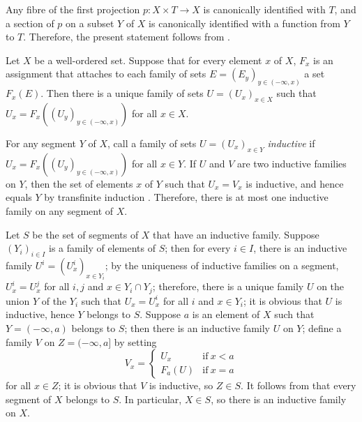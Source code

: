 \documentclass{article}
\begin{document}
Any fibre of the first projection \(p : X \times T \to X\) is
canonically identified with \(T\), and a section of \(p\) on a subset
\(Y\) of \(X\) is canonically identified with a function from \(Y\) to
\(T\).  Therefore, the present statement follows from
.

\begin{theorem}
  \label{thm:4axgzui8}
  Let \(X\) be a well-ordered set.  Suppose that for every element
  \(x\) of \(X\), \(F_x\) is an assignment that attaches to each
  family of sets \(E = (E_y)_{y \in (-\infty, x)}\) a set \(F_x(E)\).
  Then there is a unique family of sets \(U = (U_x)_{x \in X}\) such
  that \(U_x = F_x((U_y)_{y \in (-\infty, x)})\) for all \(x \in X\).
\end{theorem}

For any segment \(Y\) of \(X\), call a family of sets
\(U = (U_x)_{x \in Y}\) \emph{inductive} if
\(U_x = F_x((U_y)_{y \in (-\infty, x)})\) for all \(x \in Y\).  If
\(U\) and \(V\) are two inductive families on \(Y\), then the set of
elements \(x\) of \(Y\) such that \(U_x = V_x\) is inductive, and
hence equals \(Y\) by transfinite induction .
Therefore, there is at most one inductive family on any segment of
\(X\).

Let \(S\) be the set of segments of \(X\) that have an inductive
family.  Suppose \((Y_i)_{i \in I}\) is a family of elements of \(S\);
then for every \(i \in I\), there is an inductive family
\(U^i = (U^i_x)_{x \in Y_i}\); by the uniqueness of inductive families
on a segment, \(U^i_x = U^j_x\) for all \(i, j\) and
\(x \in Y_i \cap Y_j\); therefore, there is a unique family \(U\) on
the union \(Y\) of the \(Y_i\) such that \(U_x = U^i_x\) for all \(i\)
and \(x \in Y_i\); it is obvious that \(U\) is inductive, hence \(Y\)
belongs to \(S\).  Suppose \(a\) is an element of \(X\) such that
\(Y = (-\infty, a)\) belongs to \(S\); then there is an inductive
family \(U\) on \(Y\); define a family \(V\) on \(Z = (-\infty, a]\)
by setting
\begin{displaymath}
  V_x =
  \begin{cases}
    U_x
    & \text{if} ~ x < a \\
    F_a(U)
    & \text{if} ~ x = a
  \end{cases}
\end{displaymath}
for all \(x \in Z\); it is obvious that \(V\) is inductive, so
\(Z \in S\).  It follows from  that every segment
of \(X\) belongs to \(S\).  In particular, \(X \in S\), so there is an
inductive family on \(X\).
\end{document}
